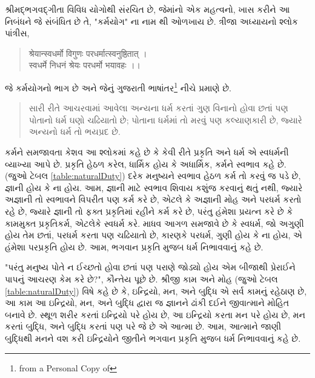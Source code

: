 \documentclass[a4paper]{article}
\begin{document}
\begin{Guja}
શ્રીમદ્ભગવદ્ગીતા વિવિધ યોગોથી સંરચિત છે, જેમાંનો એક મહત્વનો, ખાસ કરીને આ નિબંધને જે સંબંધિત છે તે, "કર્મયોગ" ના નામ થી ઓળખાય છે. ત્રીજા અધ્યાયનો શ્લોક પાંત્રીસ, 
\begin{sanskrit}
    \begin{quote}
    श्रेयान्स्वधर्मो विगुणः परधर्मात्स्वनुष्ठितात् ।
    \\स्वधर्मे निधनं श्रेयः परधर्मो भयावहः ।।
    \end{quote}
\end{sanskrit}
જે કર્મયોગનો ભાગ છે અને જેનું ગુજરાતી ભાષાંતર\footnote{from a Personal Copy of } નીચે પ્રમાણે છે.
\begin{quote}
    સારી રીતે આચરવામાં આવેલા અન્યના ધર્મ કરતાં ગુણ વિનાનો હોવા છતાં પણ પોતાનો ધર્મ ઘણો ચઢિયાતો છે; પોતાના ધર્મમાં તો મરવું પણ કલ્યાણકારી છે, જ્યારે અન્યનો ધર્મ તો ભયપ્રદ છે.
\end{quote}
કર્મને સમજાવતા કેશવ આ શ્લોકમાં કહે છે કે કેવી રીતે પ્રકૃતિ અને ધર્મ એ સ્વધર્મની વ્યાખ્યા આપે છે. પ્રકૃતિ હેઠળ કરેલ, ધાર્મિક હોય કે અધાર્મિક, કર્મને સ્વભાવ કહે છે. 
(જુઓ ટેબલ \ref{table:naturalDuty}) દરેક મનુષ્યને સ્વભાવ હેઠળ કર્મ તો કરવું જ પડે છે, જ્ઞાની હોય કે ના હોય. આમ, જ્ઞાની માટે સ્વભાવ શિવાય કશુંજ કરવાનું થતું નથી, 
જ્યારે અજ્ઞાની તો સ્વભાવને વિપરીત પણ કર્મ કરે છે, એટલે કે અજ્ઞાની મોહ અને પરધર્મ કરતો રહે છે, જ્યારે જ્ઞાની તો ફક્ત પ્રકૃતિમાં રહીને કર્મ કરે છે, પરંતુ હંમેશા પ્રયત્ન કરે છે કે કામમુક્ત પ્રકૃતિકર્મ, 
એટલેકે સ્વધર્મ કરે. માધવ આગળ સમજાવે છે કે સ્વધર્મ, જો અગુણી હોય તેમ છતાં, પરધર્મ કરતા પણ ચઢિયાતો છે, કારણકે પરધર્મ, ગુણી હોય કે ના હોય, એ હંમેશા 
પરપ્રકૃતિ હોય છે. આમ, ભગવાન પ્રકૃતિ મુજબ ધર્મ નિભાવવાનું કહે છે.

"પરંતુ મનુષ્ય પોતે ન ઈચ્છતો હોવા છતાં પણ પરાણે જોડ્યો હોય એમ બીજાથી પ્રેરાઈને પાપનું આચરણ કેમ કરે છે?", કૌન્તેય પૂછે છે. શ્રીજી કામ અને મોહ (જુઓ ટેબલ \ref{table:naturalDuty}) વિષે 
કહે છે કે, ઇન્દ્રિયો, મન, અને બુદ્ધિ એ સર્વ કામનું રહેઠાણ છે, આ કામ આ ઇન્દ્રિયો, મન, અને બુદ્ધિ દ્વારા જ જ્ઞાનને ઢાંકી દઈને જીવાત્માને મોહિત બનાવે છે. સ્થૂળ શરીર કરતાં ઇન્દ્રિયો પરે હોય છે, 
આ ઇન્દ્રિયો કરતા મન પરે હોય છે, મન કરતાં બુદ્ધિ, અને બુદ્ધિ કરતાં પણ પરે જે છે એ આત્મા છે. આમ, આત્માને જાણી બુદ્ધિથી મનને વશ કરી ઇન્દ્રિયોને જીતીને ભગવાન પ્રકૃતિ મુજબ ધર્મ નિભાવવાનું કહે છે.


\end{Guja}
\end{document}
